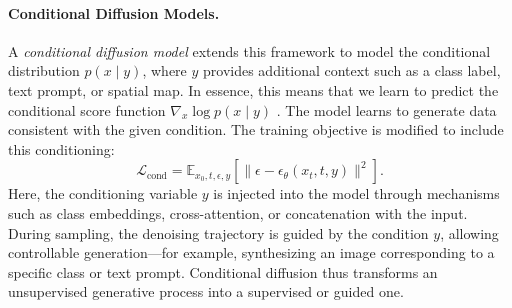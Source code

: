 \paragraph{Conditional Diffusion Models.}
A \textit{conditional diffusion model} extends this framework to model the conditional distribution \(p(x \mid y)\), where \(y\) provides additional context such as a class label, text prompt, or spatial map. In essence, this means that we learn to predict the conditional score function $\nabla_x \log p(x \mid y)$ \citep{dieleman2022guidance}. The model learns to generate data consistent with the given condition. The training objective is modified to include this conditioning:
\begin{equation}
\mathcal{L}_{\text{cond}} = \mathbb{E}_{x_0, t, \epsilon, y}\!\left[\|\epsilon - \epsilon_\theta(x_t, t, y)\|^2\right].
\end{equation}
Here, the conditioning variable \(y\) is injected into the model through mechanisms such as class embeddings, cross-attention, or concatenation with the input. During sampling, the denoising trajectory is guided by the condition \(y\), allowing controllable generation---for example, synthesizing an image corresponding to a specific class or text prompt. Conditional diffusion thus transforms an unsupervised generative process into a supervised or guided one.



